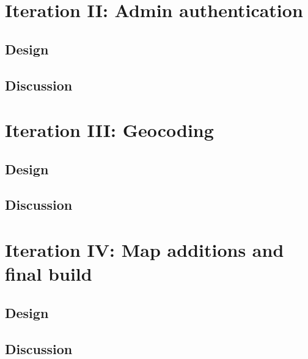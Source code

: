 \section{Iteration II: Admin authentication}
\subsection{Design}

\subsection{Discussion}

\section{Iteration III: Geocoding}
\subsection{Design}

\subsection{Discussion}

\section{Iteration IV: Map additions and final build}

\subsection{Design}

\subsection{Discussion}
